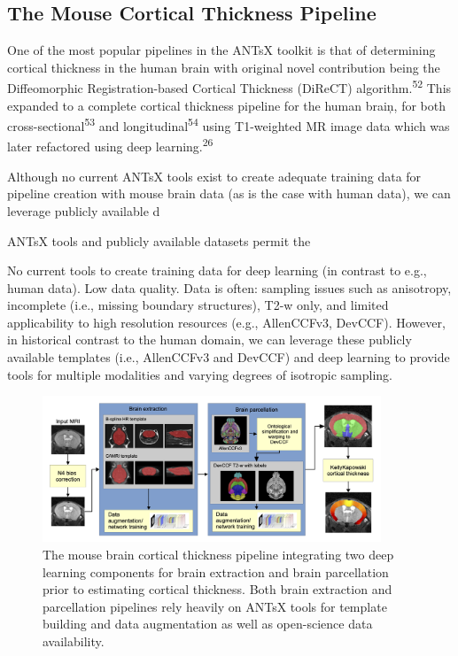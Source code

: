 \documentclass[
  12pt,
]{article}
\begin{document}
\hypertarget{the-mouse-cortical-thickness-pipeline}{%
\subsection{The Mouse Cortical Thickness
Pipeline}\label{the-mouse-cortical-thickness-pipeline}}

One of the most popular pipelines in the ANTsX toolkit is that of
determining cortical thickness in the human brain with original novel
contribution being the Diffeomorphic Registration-based Cortical
Thickness (DiReCT) algorithm.\textsuperscript{52} This expanded to a
complete cortical thickness pipeline for the human braiņ, for both
cross-sectional\textsuperscript{53} and longitudinal\textsuperscript{54}
using T1-weighted MR image data which was later refactored using deep
learning.\textsuperscript{26}

Although no current ANTsX tools exist to create adequate training data
for pipeline creation with mouse brain data (as is the case with human
data), we can leverage publicly available d

ANTsX tools and publicly available datasets permit the

No current tools to create training data for deep learning (in contrast
to e.g., human data). Low data quality. Data is often: sampling issues
such as anisotropy, incomplete (i.e., missing boundary structures), T2-w
only, and limited applicability to high resolution resources (e.g.,
AllenCCFv3, DevCCF). However, in historical contrast to the human
domain, we can leverage these publicly available templates (i.e.,
AllenCCFv3 and DevCCF) and deep learning to provide tools for multiple
modalities and varying degrees of isotropic sampling.

\begin{figure}
\centering
\includegraphics[width=0.9\textwidth]{Figures/mousePipeline.png}
\caption{The mouse brain cortical thickness pipeline integrating two 
deep learning components for brain extraction and brain parcellation 
prior to estimating cortical thickness.  Both brain extraction and
parcellation pipelines rely heavily on ANTsX tools for template building
and data augmentation as well as open-science data availability.}
\label{fig:mouseKK}
\end{figure}
\end{document}
